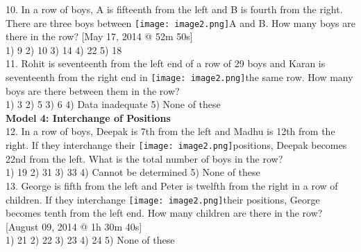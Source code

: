 \documentclass[
]{article}
\begin{document}
10. In a row of boys, A is fifteenth from the left and B is fourth from the right. There are three boys between \texttt{[image: image2.png]}A and B. How many boys are there in the row? [May 17, 2014 @ 52m 50s]\\
1) 9 \hspace{2mm}2) 10 \hspace{2mm}3) 14 \hspace{2mm}4) 22 \hspace{2mm}5) 18\\

11. Rohit is seventeenth from the left end of a row of 29 boys and Karan is seventeenth from the right end in \texttt{[image: image2.png]}the same row. How many boys are there between them in the row?\\
1) 3 \hspace{2mm}2) 5 \hspace{2mm}3) 6 \hspace{2mm}4) Data inadequate \hspace{2mm}5) None of these\\

\textbf{Model 4: Interchange of Positions}\\
12. In a row of boys, Deepak is 7th from the left and Madhu is 12th from the right. If they interchange their \texttt{[image: image2.png]}positions, Deepak becomes 22nd from the left. What is the total number of
boys in the row?\\
1) 19 \hspace{2mm}2) 31 \hspace{2mm}3) 33 \hspace{2mm}4) Cannot be determined \hspace{2mm}5) None of these\\

13. George is fifth from the left and Peter is twelfth from the right in a row of children. If they interchange \texttt{[image: image2.png]}their positions, George becomes tenth from the left end. How many children are there in the row? [August 09, 2014 @ 1h 30m 40s]\\
1) 21 \hspace{2mm}2) 22 \hspace{2mm}3) 23 \hspace{2mm}4) 24 \hspace{2mm}5) None of these\\
\end{document}
